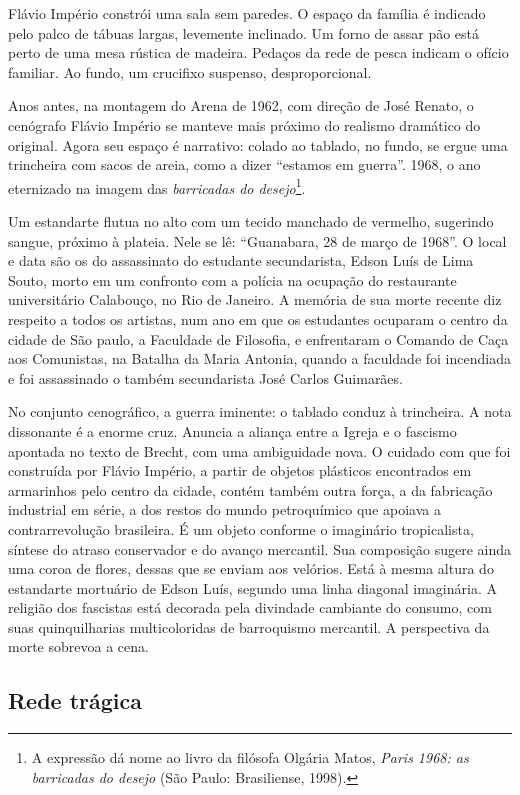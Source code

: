 Flávio Império constrói uma sala sem paredes. O espaço da família é
indicado pelo palco de tábuas largas, levemente inclinado. Um forno de
assar pão está perto de uma mesa rústica de madeira. Pedaços da rede de
pesca indicam o ofício familiar. Ao fundo, um crucifixo suspenso,
desproporcional.

Anos antes, na montagem do Arena de 1962, com direção de José Renato, o
cenógrafo Flávio Império se manteve mais próximo do realismo dramático
do original. Agora seu espaço é narrativo: colado ao tablado, no fundo,
se ergue uma trincheira com sacos de areia, como a dizer “estamos em
guerra”. 1968, o ano eternizado na imagem das {\it barricadas do
desejo}\footnote{A expressão dá nome ao livro da filósofa Olgária Matos,
  {\it Paris 1968: as barricadas do desejo} (São Paulo: Brasiliense,
  1998).}.

Um estandarte flutua no alto com um tecido manchado de vermelho,
sugerindo sangue, próximo à plateia. Nele se lê: “Guanabara, 28 de março
de 1968”. O local e data são os do assassinato do estudante
secundarista, Edson Luís de Lima Souto, morto em um confronto com a
polícia na ocupação do restaurante universitário Calabouço, no Rio de
Janeiro. A memória de sua morte recente diz respeito a todos os
artistas, num ano em que os estudantes ocuparam o centro da cidade de
São paulo, a Faculdade de Filosofia, e enfrentaram o Comando de Caça aos
Comunistas, na Batalha da Maria Antonia, quando a faculdade foi
incendiada e foi assassinado o também secundarista José Carlos
Guimarães.

No conjunto cenográfico, a guerra iminente: o tablado conduz à
trincheira. A nota dissonante é a enorme cruz. Anuncia a aliança entre a
Igreja e o fascismo apontada no texto de Brecht, com uma ambiguidade
nova. O cuidado com que foi construída por Flávio Império, a partir de
objetos plásticos encontrados em armarinhos pelo centro da cidade,
contém também outra força, a da fabricação industrial em série, a dos
restos do mundo petroquímico que apoiava a contrarrevolução brasileira.
É um objeto conforme o imaginário tropicalista, síntese do atraso
conservador e do avanço mercantil. Sua composição sugere ainda uma coroa
de flores, dessas que se enviam aos velórios. Está à mesma altura do
estandarte mortuário de Edson Luís, segundo uma linha diagonal
imaginária. A religião dos fascistas está decorada pela divindade
cambiante do consumo, com suas quinquilharias multicoloridas de
barroquismo mercantil. A perspectiva da morte sobrevoa a cena.

\subsection{Rede trágica}

